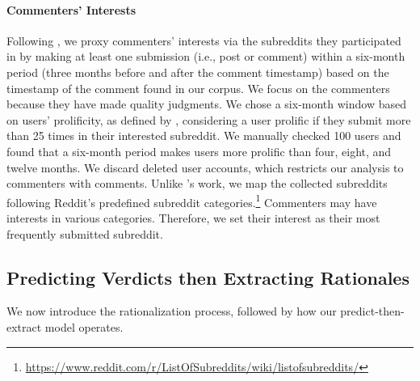 \documentclass[letterpaper]{article} %
\newcommand{\citepos}[1]{\citeauthor{#1}'s \citeyearpar{#1}}
\begin{document}
\paragraph{Commenters' Interests}

Following \citet{candia-2022-demo}, we proxy commenters' interests via the subreddits they participated in by making at least one submission (i.e., post or comment) within a six-month period (three months before and after the comment timestamp) based on the timestamp of the comment found in our corpus.
We focus on the commenters because they have made quality judgments.
We chose a six-month window based on users' prolificity, as defined by \citet{beel-2022-linguistic}, considering a user prolific if they submit more than 25 times in their interested subreddit. 
We manually checked 100 users and found that a six-month period makes users more prolific than four, eight, and twelve months.
We discard deleted user accounts, which restricts our analysis to  commenters with  comments.
Unlike \citepos{candia-2022-demo} work, we map the collected subreddits following Reddit's predefined subreddit categories.\footnote{\url{https://www.reddit.com/r/ListOfSubreddits/wiki/listofsubreddits/}}
Commenters may have interests in various categories.
Therefore, we set their interest as their most frequently submitted subreddit.

\subsection{Predicting Verdicts then Extracting Rationales}

We now introduce the rationalization process, followed by how our predict-then-extract model operates.
\end{document}
